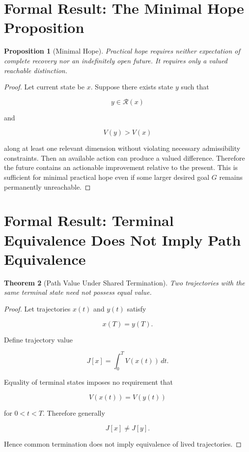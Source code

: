 \documentclass[11pt,oneside]{book}
\newtheorem{theorem}{Theorem}[chapter]
\newtheorem{proposition}[theorem]{Proposition}
\theoremstyle{definition}
\theoremstyle{remark}
\newcommand{\R}{\mathcal{R}}
\begin{document}
\section{Formal Result: The Minimal Hope Proposition}

\begin{proposition}[Minimal Hope]
Practical hope requires neither expectation of complete recovery nor an indefinitely open future. It requires only a valued reachable distinction.
\end{proposition}

\begin{proof}
Let current state be \(x\). Suppose there exists state \(y\) such that

\[
y\in\R(x)
\]

and

\[
V(y)>V(x)
\]

along at least one relevant dimension without violating necessary admissibility constraints. Then an available action can produce a valued difference. Therefore the future contains an actionable improvement relative to the present. This is sufficient for minimal practical hope even if some larger desired goal \(G\) remains permanently unreachable.
\end{proof}

\section{Formal Result: Terminal Equivalence Does Not Imply Path Equivalence}

\begin{theorem}[Path Value Under Shared Termination]
Two trajectories with the same terminal state need not possess equal value.
\end{theorem}

\begin{proof}
Let trajectories \(x(t)\) and \(y(t)\) satisfy

\[
x(T)=y(T).
\]

Define trajectory value

\[
J[x]
=
\int_0^T
V(x(t))\,dt.
\]

Equality of terminal states imposes no requirement that

\[
V(x(t))=V(y(t))
\]

for \(0<t<T\). Therefore generally

\[
J[x]\neq J[y].
\]

Hence common termination does not imply equivalence of lived trajectories.
\end{proof}
\end{document}
